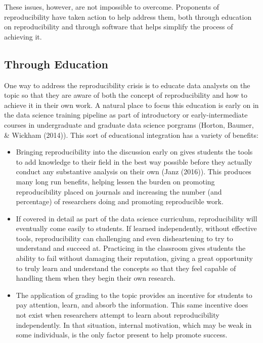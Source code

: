 \documentclass[12pt,twoside]{reedthesis}
\begin{document}
These issues, however, are not impossible to overcome. Proponents of
reproducibility have taken action to help address them, both through
education on reproducibility and through software that helps simplify
the process of achieving it.

\subsection{Through Education}\label{through-education}

One way to address the reproducibility crisis is to educate data
analysts on the topic so that they are aware of both the concept of
reproducibility and how to achieve it in their own work. A natural place
to focus this education is early on in the data science training
pipeline as part of introductory or early-intermediate courses in
undergraduate and graduate data science porgrams (Horton, Baumer, \&
Wickham (2014)). This sort of educational integration has a variety of
benefits:
\begin{itemize}
\item
  Bringing reproducibility into the discussion early on gives students
  the tools to add knowledge to their field in the best way possible
  before they actually conduct any substantive analysis on their own
  (Janz (2016)). This produces many long run benefits, helping lessen
  the burden on promoting reproducibility placed on journals and
  increasing the number (and percentage) of researchers doing and
  promoting reproducible work.
\item
  If covered in detail as part of the data science curriculum,
  reproducibility will eventually come easily to students. If learned
  independently, without effective tools, reproducibility can
  challenging and even disheartening to try to understand and succeed
  at. Practicing in the classroom gives students the ability to fail
  without damaging their reputation, giving a great opportunity to truly
  learn and understand the concepts so that they feel capable of
  handling them when they begin their own research.
\item
  The application of grading to the topic provides an incentive for
  students to pay attention, learn, and absorb the information. This
  same incentive does not exist when researchers attempt to learn about
  reproducibility independently. In that situation, internal motivation,
  which may be weak in some individuals, is the only factor present to
  help promote success.
\end{itemize}
\end{document}
